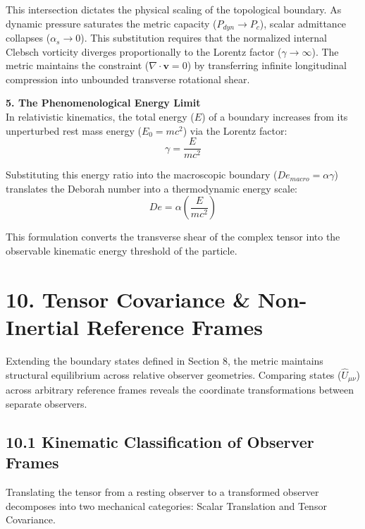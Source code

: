 This intersection dictates the physical scaling of the topological boundary. As dynamic pressure saturates the metric capacity ($P_{dyn} \to P_c$), scalar admittance collapses ($\alpha_s \to 0$). This substitution requires that the normalized internal Clebsch vorticity diverges proportionally to the Lorentz factor ($\gamma \to \infty$). The metric maintains the constraint ($\nabla \cdot \mathbf{v} = 0$) by transferring infinite longitudinal compression into unbounded transverse rotational shear. 

\textbf{5. The Phenomenological Energy Limit} \\ 
In relativistic kinematics, the total energy ($E$) of a boundary increases from its unperturbed rest mass energy ($E_0 = m c^2$) via the Lorentz factor:
\begin{equation}
    \gamma = \frac{E}{m c^2}
\end{equation}

Substituting this energy ratio into the macroscopic boundary ($De_{macro} = \alpha \gamma$) translates the Deborah number into a thermodynamic energy scale: 
\begin{equation}
    De = \alpha \left( \frac{E}{m c^2} \right)
\end{equation}

This formulation converts the transverse shear of the complex tensor into the observable kinematic energy threshold of the particle. 

\section*{10. Tensor Covariance \& Non-Inertial Reference Frames}
Extending the boundary states defined in Section 8, the metric maintains structural equilibrium across relative observer geometries. Comparing states ($\hat{U}_{\mu\nu}$) across arbitrary reference frames reveals the coordinate transformations between separate observers. 

\subsection*{10.1 Kinematic Classification of Observer Frames}
Translating the tensor from a resting observer to a transformed observer decomposes into two mechanical categories: Scalar Translation and Tensor Covariance.

\vspace{0.2 cm}

